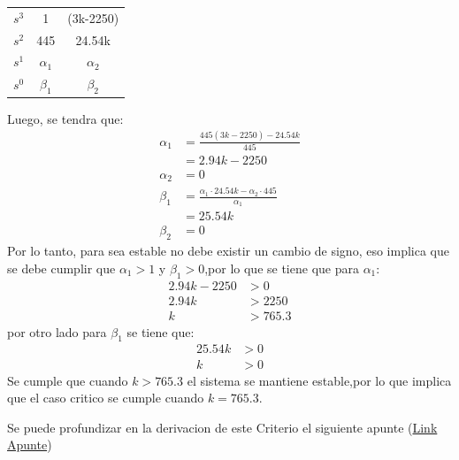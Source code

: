 \documentclass[
  11pt,
  letterpaper,
   addpoints,
   answers
  ]{exam}
\begin{document}
\begin{questions}
\begin{solution}
\begin{center}
        \begin{tabular}{|c|c|c|}
            \hline
            $s^{3}$ & 1 & (3k-2250)\\
            $s^{2}$ & 445 & 24.54k\\
            $s^{1}$ & $\alpha_{1}$ & $\alpha_{2}$\\
            $s^{0}$ & $\beta_{1}$ & $\beta_{2}$\\
            \hline
        \end{tabular}
    \end{center}
    Luego, se tendra que:
    \begin{align}
        \alpha_{1} &= \frac{445(3k-2250) - 24.54k}{445}\\
                   &= 2.94k - 2250\\
        \alpha_{2} &= 0\\
        \beta_{1}  &= \frac{\alpha_{1} \cdot 24.54k - \alpha_{2}\cdot 445}{\alpha_{1}}\\
                   &= 25.54k\\
        \beta_{2}  &=0
    \end{align}
    Por lo tanto, para sea estable no debe existir un cambio de signo, eso implica que se debe cumplir que $\alpha_{1}>1$ y $\beta_{1}>0$,por lo que se tiene que para $\alpha_{1}$:
    \begin{align}
        2.94k - 2250 &> 0\\
        2.94k &> 2250\\
        k &> 765.3
    \end{align}
    por otro lado para $\beta_{1}$ se tiene que:
    \begin{align}
        25.54k &> 0\\
        k &> 0
    \end{align}
    Se cumple que cuando $k>765.3$ el sistema se mantiene estable,por lo que implica que el caso critico se cumple cuando $k=765.3$.

    Se puede profundizar en la derivacion de este Criterio el siguiente apunte (\href{https://sites.google.com/site/robertocardenasdobson/apuntes-de-asignaturas?authuser=0}{Link Apunte})


\end{solution}
\end{questions}
\end{document}
